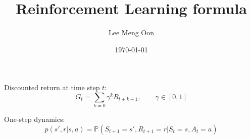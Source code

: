 \documentclass[12pt, a4paper]{article}
\begin{document}
\title{Reinforcement Learning formula}
\author{Lee Meng Oon}
\date{\today}

\maketitle

Discounted return at time step $t$:
\begin{equation}
G_{t} = \sum_{k=0} \gamma^{k} R_{t+k+1}, \qquad \gamma \in [0, 1]
\end{equation}

One-step dynamics:
\begin{equation}
p(s', r | s, a) = \mathbb{P}(S_{t+1}=s', R_{t+1}=r | S_{t}=s, A_{t}=a)
\end{equation}
\end{document}
